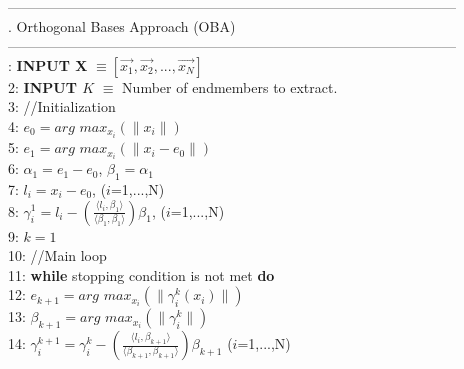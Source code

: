 \documentclass[11pt, oneside]{Thesis} %
\begin{document}
\newpage
\noindent------------------------------------------------------------------------------------------------\\
.\hspace{2.5cm} Orthogonal Bases Approach (OBA)\\
\noindent------------------------------------------------------------------------------------------------\\
: \hspace{0.3cm}\textbf{INPUT X} $\equiv \left[ \vec{x_{1}}, \vec{x_{2}}, ..., \vec{x_{N}} \right]$\\
2: \hspace{0.3cm}\textbf{INPUT $K$} $\equiv$ Number of endmembers to extract.\\
3: \hspace{0.3cm}//Initialization\\
4: \hspace{0.3cm}$e_{0} = arg$ $max_{x_{i}} \left( \parallel x_{i} \parallel \right)$ \\
5: \hspace{0.3cm}$e_{1} = arg$ $max_{x_{i}} \left( \parallel x_{i} - e_{0} \parallel \right)$ \\
6: \hspace{0.3cm}$\alpha_{1} = e_{1} - e_{0}$, $\beta_{1} = \alpha_{1}$\\
7: \hspace{0.3cm}$l_{i}=x_{i}-e_{0}$, ($i$=1,...,N)\\
8: \hspace{0.3cm}$\gamma_{i}^{1} = l_{i}-\left( \frac{\langle l_{i}, \beta_{1} \rangle }{\langle \beta_{1}, \beta_{1} \rangle}  \right)\beta_{1}$, ($i$=1,...,N)\\
9: \hspace{0.3cm}$k=1$ \\
10: \hspace{0.15cm}//Main loop	  \\
11: \hspace{0.15cm}\textbf{while} stopping condition is not met \textbf{do}\\
12: \hspace{0.8cm}$e_{k+1} = arg$ $max_{x_{i}}\left( \parallel \gamma_{i}^{k}\left(x_{i}\right) \parallel \right)$\\
13: \hspace{0.8cm}$\beta_{k+1} = arg$ $max_{x_{i}}\left( \parallel \gamma_{i}^{k} \parallel \right)$\\
14: \hspace{0.8cm}$\gamma_{i}^{k+1} = \gamma_{i}^{k}-\left( \frac{\langle l_{i}, \beta_{k+1} \rangle}{\langle \beta_{k+1}, \beta_{k+1} \rangle}  \right)\beta_{k+1}$ \hspace{2cm}($i$=1,...,N)\\
\end{document}
